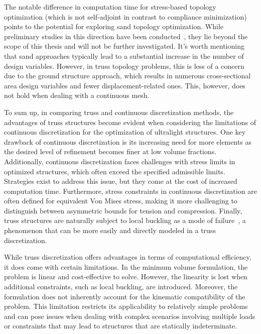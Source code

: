 The notable difference in computation time for stress-based topology optimization (which is not self-adjoint in contrast to compliance minimization) points to the potential for exploring \gls{sand} topology optimization. While preliminary studies in this direction have been conducted~, they lie beyond the scope of this thesis and will not be further investigated. It's worth mentioning that \gls{sand} approaches typically lead to a substantial increase in the number of design variables. However, in truss topology problems, this is less of a concern due to the ground structure approach, which results in numerous cross-sectional area design variables and fewer displacement-related ones. This, however, does not hold when dealing with a continuous mesh.

To sum up, in comparing truss and continuous discretization methods, the advantages of truss structures become evident when considering the limitations of continuous discretization for the optimization of ultralight structures. One key drawback of continuous discretization is its increasing need for more elements as the desired level of refinement becomes finer at low volume fractions. Additionally, continuous discretization faces challenges with stress limits in optimized structures, which often exceed the specified admissible limits. Strategies exist to address this issue, but they come at the cost of increased computation time. Furthermore, stress constraints in continuous discretization are often defined for equivalent Von Mises stress, making it more challenging to distinguish between asymmetric bounds for tension and compression. Finally, truss structures are naturally subject to local buckling as a mode of failure~, a phenomenon that can be more easily and directly modeled in a truss discretization. 

While truss discretization offers advantages in terms of computational efficiency, it does come with certain limitations. In the minimum volume formulation, the problem is linear and cost-effective to solve. However, the linearity is lost when additional constraints, such as local buckling, are introduced. Moreover, the formulation does not inherently account for the kinematic compatibility of the problem. This limitation restricts its applicability to relatively simple problems and can pose issues when dealing with complex scenarios involving multiple loads or constraints that may lead to structures that are statically indeterminate.

